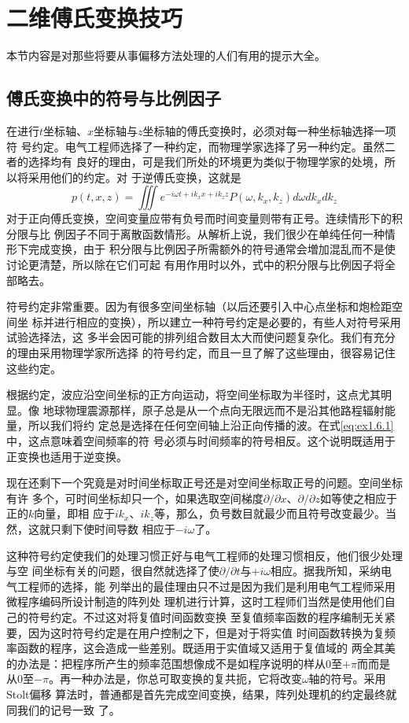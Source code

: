 \section{二维傅氏变换技巧}
\label{sec:1.6}

本节内容是对那些将要从事偏移方法处理的人们有用的提示大全。

\subsection{傅氏变换中的符号与比例因子}
\label{sec:1.6.1}

在进行$t$坐标轴、$x$坐标轴与$z$坐标轴的傅氏变换时，必须对每一种坐标轴选择一项符
号约定。电气工程师选择了一种约定，而物理学家选择了另一种约定。虽然二者的选择均有
良好的理由，可是我们所处的环境更为类似于物理学家的处境，所以将采用他们的约定。对
于逆傅氏变换，这就是
\begin{equation}
p(t,x,z)=\iiint e^{-i\omega t+ik_xx+ik_zz}P(\omega,k_x,k_z)d\omega dk_x dk_z
\label{eq:ex1.6.1}
\end{equation}
对于正向傅氏变换，空间变量应带有负号而时间变量则带有正号。连续情形下的积分限与比
例因子不同于离散函数情形。从解析上说，我们很少在单纯任何一种情形下完成变换，由于
积分限与比例因子所需额外的符号通常会増加混乱而不是使讨论更清楚，所以除在它们可起
有用作用时以外，式中的积分限与比例因子将全部略去。

符号约定非常重要。因为有很多空间坐标轴（以后还要引入中心点坐标和炮检距空间坐
标并进行相应的变换），所以建立一种符号约定是必要的，有些人对符号采用试验选择法，这
多半会因可能的排列组合数目太大而使问题复杂化。我们有充分的理由采用物理学家所选择
的符号约定，而且一旦了解了这些理由，很容易记住这些约定。

根据约定，波应沿空间坐标的正方向运动，将空间坐标取为半径时，这点尤其明显。像
地球物理震源那样，原子总是从一个点向无限远而不是沿其他路程辐射能量，所以我们将约
定总是选择在任何空间轴上沿正向传播的波。在式\ref{eq:ex1.6.1}中，这点意味着空间频率的符
号必须与时间频率的符号相反。这个说明既适用于正变换也适用于逆变换。

现在还剩下一个究竟是对时间坐标取正号还是对空间坐标取正号的问题。空间坐标有许
多个，可时间坐标却只一个，如果选取空间梯度$\partial/\partial x$、$\partial/\partial z$如等使之相应于正的$k$向量，即相
应于$ik_x$、$ik_z$等，那么，负号数目就最少而且符号改变最少。当然，这就只剩下使时间导数
相应于$-i\omega$了。

这种符号约定使我们的处理习惯正好与电气工程师的处理习惯相反，他们很少处理与空
间坐标有关的问题，很自然就选择了使$\partial/\partial t$与$+i\omega$相应。据我所知，采纳电气工程师的选择，能
列举出的最佳理由只不过是因为我们是利用电气工程师采用微程序编码所设计制造的阵列处
理机进行计算，这时工程师们当然是使用他们自己的符号约定。不过这对将复值时间函数变换
至复值频率函数的程序编制无关紧要，因为这时符号约定是在用户控制之下，但是对于将实值
时间函数转换为复频率函数的程序，这会造成一些差别。既适用于实值域又适用于复值域的
两全其美的办法是：把程序所产生的频率范围想像成不是如程序说明的样从0至$+\pi$而而是
从0至$-\pi$。再一种办法是，你总可取变换的复共扼，它将改变$\omega$轴的符号。采用Stolt偏移
算法时，普通都是首先完成空间变换，结果，阵列处理机的约定最终就同我们的记号一致
了。

